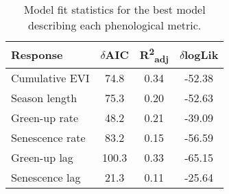 \begin{table}[h]
\caption[Model fit statistics]{Model fit statistics for the best model describing each phenological metric.} 
\label{phen:mod_stat}
\begin{tabular}{lSSS}
  \toprule
Response & $\delta$AIC & R\textsuperscript{2}\textsubscript{adj} & $\delta$logLik \\ 
  \midrule
Cumulative EVI & 74.8 & 0.34 & -52.38 \\ 
  Season length & 75.3 & 0.20 & -52.63 \\ 
  Green-up rate & 48.2 & 0.21 & -39.09 \\ 
  Senescence rate & 83.2 & 0.15 & -56.59 \\ 
  Green-up lag & 100.3 & 0.33 & -65.15 \\ 
  Senescence lag & 21.3 & 0.11 & -25.64 \\ 
   \bottomrule
\end{tabular}
\end{table}

